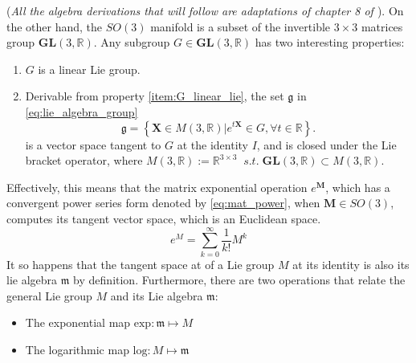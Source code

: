 (\emph{All the algebra derivations that will follow are adaptations of chapter 8 of \cite{se3_tutorial}}).
On the other hand, the $SO(3)$ manifold is a subset of the invertible 
$3\!\times\!3$ matrices group $\mathbf{GL}(3, \mathbb{R})$. 
Any subgroup $G \in \mathbf{GL}(3, \mathbb{R})$ has two interesting properties:
\begin{enumerate}
    \item\label{item:G_linear_lie} $G$ is a linear Lie group.
    \item Derivable from property \ref{item:G_linear_lie}, the set $\mathfrak{g}$ in \ref{eq:lie_algebra_group}
    \begin{equation}\label{eq:lie_algebra_group}
    \mathfrak{g}=\left\{\mathbf{X}\in M (3,\mathbb{R})\rvert e^{t\mathbf{X}}\in G, \forall t \in \mathbb{R}\right\}.
    \end{equation}
    is a vector space tangent to $G$ at the identity $I$, and is closed under the Lie bracket operator, where $ M (3,\mathbb{R}):=\mathbb{R}^{3\!\times\! 3} \;\; s.t. \; \mathbf{GL}(3, \mathbb{R})\subset M (3,\mathbb{R})$.
\end{enumerate}

Effectively, this means that the matrix exponential operation $e^\mathbf{M}$, which has a convergent power series form denoted by \ref{eq:mat_power}, when $\mathbf{M}\in SO(3)$, computes its tangent vector space, which is an Euclidean space.
\begin{equation}\label{eq:mat_power}
    e^ M =\sum_{k=0}^{\infty }\frac{1}{k!} M ^k
\end{equation}
It so happens that the tangent space at of a Lie group $ M $ at its identity is also its lie algebra $\mathfrak{m}$ by definition.
Furthermore, there are two operations that relate the general Lie group $ M $ and its Lie algebra $\mathfrak{m}$:
\begin{itemize}
    \item The exponential map $\textrm{exp}:\mathfrak{m}\mapsto M $
    \item The logarithmic map $\textrm{log}: M \mapsto\mathfrak{m}$
\end{itemize}

